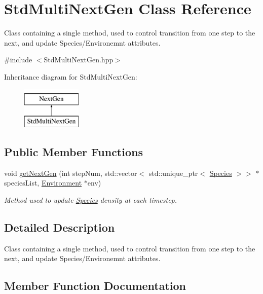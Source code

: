 \hypertarget{classStdMultiNextGen}{}\section{Std\+Multi\+Next\+Gen Class Reference}
\label{classStdMultiNextGen}


Class containing a single method, used to control transition from one step to the next, and update Species/\+Environemnt attributes.  




{\ttfamily \#include $<$Std\+Multi\+Next\+Gen.\+hpp$>$}

Inheritance diagram for Std\+Multi\+Next\+Gen\+:\begin{figure}[H]
\begin{center}
\leavevmode
\includegraphics[height=2.000000cm]{classStdMultiNextGen}
\end{center}
\end{figure}
\subsection*{Public Member Functions}
\begin{DoxyCompactItemize}
\item 
void \hyperlink{classStdMultiNextGen_a4e3a48cdc731da26abe8b1f32cdbf962}{get\+Next\+Gen} (int step\+Num, std\+::vector$<$ std\+::unique\+\_\+ptr$<$ \hyperlink{classSpecies}{Species} $>$$>$ $\ast$species\+List, \hyperlink{classEnvironment}{Environment} $\ast$env)
\begin{DoxyCompactList}\small\item\em Method used to update \hyperlink{classSpecies}{Species} density at each timestep. \end{DoxyCompactList}\end{DoxyCompactItemize}


\subsection{Detailed Description}
Class containing a single method, used to control transition from one step to the next, and update Species/\+Environemnt attributes. 

\subsection{Member Function Documentation}
\hypertarget{classStdMultiNextGen_a4e3a48cdc731da26abe8b1f32cdbf962}{}\label{classStdMultiNextGen_a4e3a48cdc731da26abe8b1f32cdbf962} 
